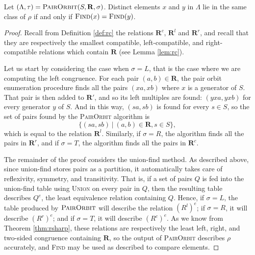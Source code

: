 \begin{theorem}
  \label{thm:p}
  Let $(\Lambda, \tau) = \textsc{PairOrbit}(S, \mathbf{R}, \sigma)$.  Distinct elements
  $x$ and $y$ in $\Lambda$ lie in the same class of $\rho$ if and only if
  $\textsc{Find}(x) = \textsc{Find}(y)$.
  \begin{proof}
    Recall from Definition \ref{def:rc} the relations $\mathbf{R}^c$,
    $\mathbf{R}^l$ and $\mathbf{R}^r$, and recall that they are respectively the
    smallest compatible, left-compatible, and right-compatible relations which
    contain $\mathbf{R}$ (see Lemma \ref{lem:rc}).

    Let us start by considering the case when $\sigma = L$, that is the case
    where we are computing the left congruence.  For each pair
    $(a,b) \in \mathbf{R}$, the pair orbit enumeration procedure finds all the
    pairs $(xa, xb)$ where $x$ is a generator of $S$.  That pair is then added
    to $\mathbf{R}'$, and so its left multiples are found: $(yxa, yxb)$ for
    every generator $y$ of $S$.  And in this way, $(sa, sb)$ is found for every
    $s \in S$, so the set of pairs found by the \textsc{PairOrbit} algorithm is
    $$\{(sa, sb) ~|~ (a,b) \in \mathbf{R}, s \in S\},$$
    which is equal to the relation $\mathbf{R}^l$.
    Similarly, if $\sigma = R$, the algorithm finds all the pairs in
    $\mathbf{R}^r$, and if $\sigma = T$, the algorithm finds all the pairs in
    $\mathbf{R}^c$.

    The remainder of the proof considers the union-find method.  As described
    above, since union-find stores pairs as a partition, it automatically takes
    care of reflexivity, symmetry, and transitivity.  That is, if a set of pairs
    $Q$ is fed into the union-find table using \textsc{Union} on every pair in
    $Q$, then the resulting table describes $Q^e$, the least equivalence
    relation containing $Q$.  Hence, if $\sigma = L$, the table produced by
    $\textsc{PairOrbit}$ will describe the relation $(R^l)^e$; if $\sigma = R$, it will
    describe $(R^r)^e$; and if $\sigma = T$, it will describe $(R^c)^e$.  As we
    know from Theorem \ref{thm:rsharp}, these relations are respectively the least
    left, right, and two-sided congruence containing $\mathbf{R}$, so the output
    of \textsc{PairOrbit} describes $\rho$ accurately, and \textsc{Find} may be used as
    described to compare elements.
  \end{proof}
\end{theorem}

